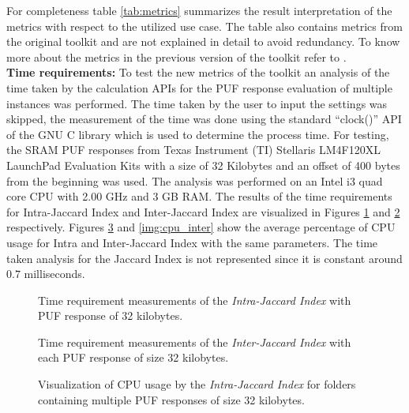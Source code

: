 For completeness table \ref{tab:metrics} summarizes the result interpretation of the metrics with respect to the utilized use case. The table also contains metrics from the original toolkit and are not explained in detail to avoid redundancy. To know more about the metrics in the previous version of the toolkit refer to \cite{71}.\\

\textbf{Time requirements:} To test the new metrics of the toolkit an analysis of the time taken by the calculation APIs for the PUF response evaluation of multiple instances was performed. The time taken by the user to input the settings was skipped, the measurement of the time was done using the standard ``clock()'' API of the GNU C library which is used to determine the process time. For testing, the SRAM PUF responses from Texas Instrument (TI) Stellaris LM4F120XL LaunchPad Evaluation Kits with a
size of 32 Kilobytes and an offset of 400 bytes from the beginning was used. The analysis was performed on an Intel i3 quad core CPU with 2.00 GHz and 3 GB RAM. The results of the time requirements for Intra-Jaccard Index and Inter-Jaccard Index are visualized in Figures \ref{img:time_intra} and \ref{img:time_inter} respectively. Figures \ref{img:cpu_intra} and \ref{img:cpu_inter} show the average percentage of CPU usage for Intra and Inter-Jaccard Index with the same parameters. The time taken analysis for the Jaccard Index is not represented since it is constant around $0.7$ milliseconds.
\vspace*{1.5\baselineskip}

\begin{figure}[h]
\centering
{}
\caption{Time requirement measurements of the \emph{Intra-Jaccard Index} with PUF response of 32 kilobytes.}
\label{img:time_intra}
\end{figure}


\begin{figure}[t!]
\centering
{}
\caption{Time requirement measurements of the \emph{Inter-Jaccard Index} with each PUF response of size 32 kilobytes.}
\label{img:time_inter}
\end{figure}

\begin{figure}[h!]
\centering
{}
\caption{Visualization of CPU usage by the \emph{Intra-Jaccard Index} for folders containing multiple PUF responses of size 32 kilobytes.}
\label{img:cpu_intra}
\end{figure}

